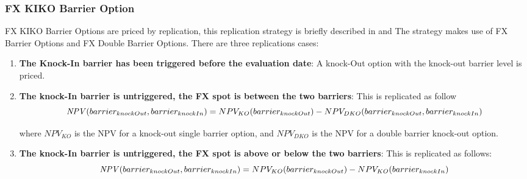 \subsubsection{FX KIKO Barrier Option}
\label{pricing:fx_kikobarrieroption}

FX KIKO Barrier Options are priced by replication, this replication strategy is briefly described in \cite{Clark_2011} and \cite{Wystup_2006}
The strategy makes use of FX Barrier Options and FX Double Barrier Options.
There are three replications cases:
\begin{enumerate}
\item \textbf{The Knock-In barrier has been triggered before the evaluation date}: A knock-Out option with the knock-out barrier level is priced.
\item \textbf{The knock-In barrier is untriggered, the FX spot is between the two barriers}: This is replicated as follow
$$
\mathit{NPV}(barrier_{knockOut}, barrier_{knockIn}) = NPV_{KO}(barrier_{knockOut}) - NPV_{DKO}(barrier_{knockOut}, barrier_{knockIn})
$$

where $NPV_{KO}$ is the NPV for a knock-out single barrier option, and $NPV_{DKO}$ is the NPV for a double barrier knock-out option.

\item \textbf{The knock-In barrier is untriggered, the FX spot is above or below the two barriers}: This is replicated as follows:
$$
\mathit{NPV}(barrier_{knockOut}, barrier_{knockIn}) = NPV_{KO}(barrier_{knockOut}) - NPV_{KO}(barrier_{knockIn})
$$



\end{enumerate}

